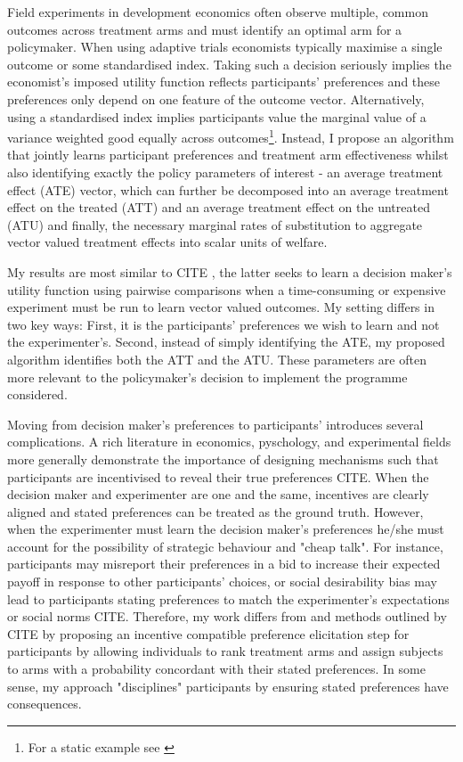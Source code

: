 \documentclass[twoside,11pt]{article}
\begin{document}
Field experiments in development economics often observe multiple, common outcomes 
across treatment arms and must identify an optimal arm for a policymaker. 
 When using adaptive trials economists typically maximise a single outcome or 
 some standardised index. Taking such a decision seriously 
implies the economist's imposed utility function reflects participants' preferences 
and these preferences only depend on one feature of the outcome vector. Alternatively, 
using a standardised index implies 
participants value the marginal value of a variance weighted good equally across 
outcomes\footnote{For a static example see \cite{ashraf2010a}}. Instead, I propose an algorithm that jointly learns participant 
preferences and treatment arm effectiveness whilst also identifying exactly the 
policy parameters of interest - an average treatment effect (ATE) vector, which 
can further be decomposed into an average treatment effect on the treated (ATT) and 
an average treatment effect on the untreated (ATU) and finally, the necessary marginal 
rates of substitution to 
aggregate vector valued treatment effects into scalar units of  welfare. 


My results are most similar to CITE \citep{lin2022preference}, the latter seeks 
to learn a decision maker's utility function using pairwise comparisons when a 
time-consuming or expensive experiment must be run to learn 
vector valued outcomes. My setting differs in two key ways: First, it is the 
participants' preferences we wish to learn and not the experimenter's. Second, 
instead of simply identifying the ATE, my proposed algorithm identifies both 
the ATT and the ATU. These parameters are often more relevant to the policymaker's 
decision to implement the programme considered.


Moving from decision maker's preferences to participants' introduces several 
complications. A rich literature in economics, pyschology, and experimental fields 
more generally demonstrate 
the importance of designing mechanisms such that participants are incentivised 
to reveal their true preferences CITE. When the decision maker and experimenter are 
one and the same, 
incentives are clearly aligned and stated preferences can be treated as the ground 
truth. However, when the experimenter must learn the decision maker's 
preferences he/she must account for the possibility of strategic behaviour and 
"cheap talk". For instance, participants may misreport their preferences in a bid
to increase their expected payoff in response to other participants' choices, or 
social desirability bias may lead to participants stating preferences to match 
the experimenter's expectations or social norms CITE. Therefore, my work 
differs from \cite{lin2022preference} and methods outlined by CITE by proposing 
an incentive compatible 
preference elicitation step for participants by allowing individuals
to rank treatment arms and assign subjects to arms with a probability
concordant with their stated preferences. In some sense, my approach "disciplines"
participants by ensuring stated preferences have consequences.
\end{document}
